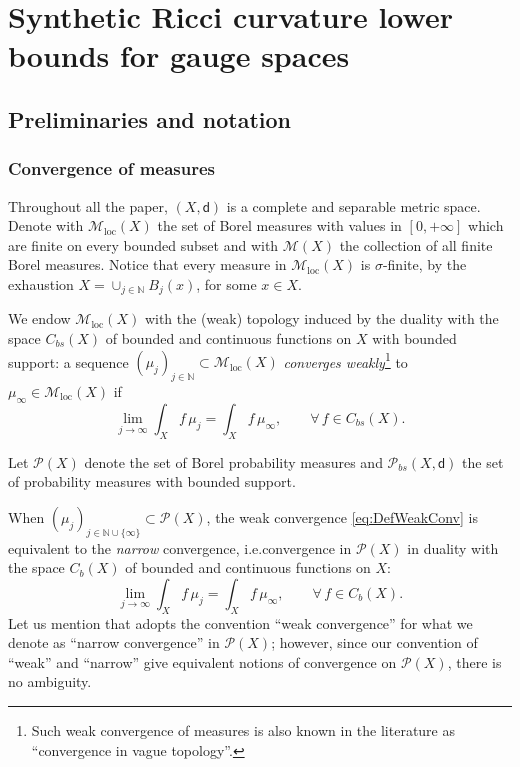 \documentclass[11pt,a4paper]{article}
\theoremstyle{plain}
\theoremstyle{definition}
\theoremstyle{remark}
\numberwithin{equation}{section}
\newcommand{\N}{\mathbb{N}} %
\newcommand{\loc}{\mathrm{loc}}
\newcommand{\Prob}{\mathcal{P}}
\newcommand{\sM}{\mathscr{M}}
\newcommand{\sfd}{\mathsf d}
\begin{document}
\section{Synthetic Ricci curvature lower bounds for gauge spaces}\label{sec:CDbeta} 

\subsection{Preliminaries and notation}

\subsubsection{Convergence of measures}
Throughout all the paper, $(X,\sfd)$ is a complete and separable metric space. Denote with $\sM_{\loc}(X)$ the set of Borel measures with values in $[0,+\infty]$ which are finite on every bounded subset and with  $\sM(X)$ the collection of  all finite Borel measures.  Notice that every measure in $\sM_{\loc}(X)$ is $\sigma$-finite, by the exhaustion $X=\cup_{j\in \N} B_{j}(x)$, for some $x\in X$. 

We endow  $\sM_{\loc}(X)$ with the (weak) topology induced by the duality with the space $C_{bs}(X)$ of bounded and continuous functions on $X$ with bounded support: a sequence $(\mu_{j})_{j\in\N}\subset \sM_{\loc}(X)$ \emph{converges weakly}\footnote{Such weak convergence of measures is also known in the literature as ``convergence in vague topology''.} to $\mu_{\infty}\in \sM_{\loc}(X)$ if
\begin{equation}\label{eq:DefWeakConv}
\lim_{j\to \infty} \int_{X} f\,  \mu_{j} = \int_{X} f\, \mu_{\infty}, \qquad \forall\, f\in C_{bs}(X). 
\end{equation}

Let  $\Prob(X)$ denote the set of Borel probability measures and $\Prob_{bs}(X,\sfd)$ the set of probability measures with bounded support.

When $(\mu_{j})_{j\in \N\cup \{\infty\}}\subset \Prob(X)$, the weak convergence \eqref{eq:DefWeakConv} is equivalent to the \emph{narrow} convergence, i.e.\@ convergence in $\Prob(X)$ in duality with the space $C_{b}(X)$ of  bounded and continuous functions on $X$:
\begin{equation*}
\lim_{j\to \infty} \int_{X} f\,  \mu_{j} = \int_{X} f\, \mu_{\infty}, \qquad \forall\, f\in C_{b}(X). 
\end{equation*}
Let us mention that \cite{Vil} adopts the convention ``weak convergence''  for what we denote as ``narrow convergence'' in $\Prob(X)$; however, since our convention of  ``weak'' and ``narrow'' give equivalent notions of convergence on $\Prob(X)$, there is no ambiguity.
\end{document}
